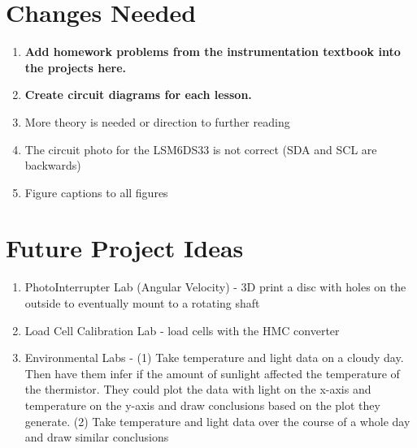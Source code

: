 \section{Changes Needed}
\begin{enumerate}[itemsep=-5pt]
\item {\bf Add homework problems from the instrumentation textbook into the projects here.}
\item {\bf Create circuit diagrams for each lesson.}
\item More theory is needed or direction to further reading 
\item The circuit photo for the LSM6DS33 is not correct (SDA and SCL are backwards)
\item Figure captions to all figures
\end{enumerate}

\section{Future Project Ideas}
\begin{enumerate}[itemsep=-5pt]
\item PhotoInterrupter Lab (Angular Velocity) - 3D print a disc with holes on the outside to eventually mount to a rotating shaft  
\item Load Cell Calibration Lab - load cells with the HMC converter
\item Environmental Labs - (1) Take temperature and light data on a cloudy day. Then have them infer if the amount of sunlight affected the temperature of the thermistor. They could plot the data with light on the x-axis and temperature on the y-axis and draw conclusions based on the plot they generate. (2) Take temperature and light data over the course of a whole day and draw similar conclusions
\end{enumerate}
